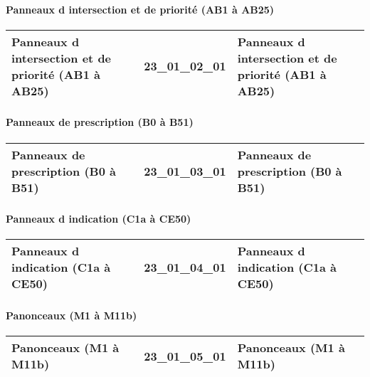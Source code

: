 \documentclass[12pt,titlepage,oneside]{book}
\begin{document}
\paragraph{Panneaux d intersection et de priorité (AB1 à AB25)}
\noindent
\vspace{\baselineskip}

\renewcommand{\arraystretch}{1.2}
\begin{supertabular}{|p{10cm}|c|p{15cm}|}
 Panneaux d intersection et de priorité (AB1 à AB25) & 23\_01\_02\_01 & Panneaux d intersection et de priorité (AB1 à AB25)\\
\hline
\end{supertabular}


\paragraph{Panneaux de prescription (B0 à B51)}
\noindent
\vspace{\baselineskip}

\renewcommand{\arraystretch}{1.2}
\begin{supertabular}{|p{10cm}|c|p{15cm}|}
 Panneaux de prescription (B0 à B51) & 23\_01\_03\_01 & Panneaux de prescription (B0 à B51)\\
\hline
\end{supertabular}


\paragraph{Panneaux d indication (C1a à CE50)}
\noindent
\vspace{\baselineskip}

\renewcommand{\arraystretch}{1.2}
\begin{supertabular}{|p{10cm}|c|p{15cm}|}
 Panneaux d indication (C1a à CE50) & 23\_01\_04\_01 & Panneaux d indication (C1a à CE50)\\
\hline
\end{supertabular}


\paragraph{Panonceaux (M1 à M11b)}
\noindent
\vspace{\baselineskip}

\renewcommand{\arraystretch}{1.2}
\begin{supertabular}{|p{10cm}|c|p{15cm}|}
 Panonceaux (M1 à M11b) & 23\_01\_05\_01 & Panonceaux (M1 à M11b)\\
\hline
\end{supertabular}
\end{document}
